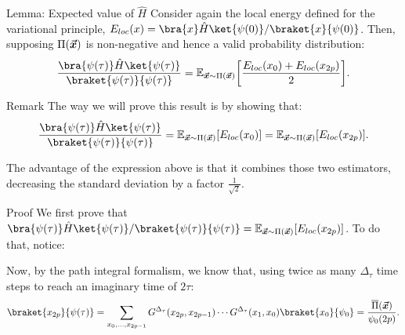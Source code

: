 \documentclass[a4paper]{article}
\begin{document}
\begin{parag}{Lemma: Expected value of $\hat{H}$}
    Consider again the local energy defined for the variational principle, $E_{loc}\left(x\right) = \bra{x} \hat{H} \ket{\psi\left(0\right)} / \braket{x}{\psi\left(0\right)}$. Then, supposing $\Pi\left(\bvec{x}\right)$ is non-negative and hence a valid probability distribution: 
    \[\frac{\bra{\psi\left(\tau\right)} \hat{H} \ket{\psi\left(\tau\right)}}{\braket{\psi\left(\tau\right)}{\psi\left(\tau\right)}} = \exval_{\bvec{x} \followsdistr \Pi\left(\bvec{x}\right)}\left[\frac{E_{loc}\left(x_0\right) + E_{loc}\left(x_{2p}\right)}{2}\right].\]
    
    \begin{subparag}{Remark}
        The way we will prove this result is by showing that:
        \[\frac{\bra{\psi\left(\tau\right)} \hat{H} \ket{\psi\left(\tau\right)}}{\braket{\psi\left(\tau\right)}{\psi\left(\tau\right)}} = \exval_{\bvec{x} \followsdistr \Pi\left(\bvec{x}\right)}\left[E_{loc}\left(x_0\right)\right] = \exval_{\bvec{x} \followsdistr \Pi\left(\bvec{x}\right)}\left[E_{loc}\left(x_{2p}\right)\right].\]

        The advantage of the expression above is that it combines those two estimators, decreasing the standard deviation by a factor $\frac{1}{\sqrt{2}}$.
    \end{subparag}
    
    \begin{subparag}{Proof}
        We first prove that $\bra{\psi\left(\tau\right)} \hat{H} \ket{\psi\left(\tau\right)}/\braket{\psi\left(\tau\right)}{\psi\left(\tau\right)} = \exval_{\bvec{x} \followsdistr \Pi\left(\bvec{x}\right)}\left[E_{loc}\left(x_{2p}\right)\right]$. To do that, notice:

        Now, by the path integral formalism, we know that, using twice as many $\Delta_{\tau}$ time steps to reach an imaginary time of $2\tau$:
        \[\braket{x_{2p}}{\psi\left(\tau\right)} = \sum_{x_0, \ldots, x_{2p-1}} G^{\Delta_{\tau}}\left(x_{2p}, x_{2p - 1}\right) \cdots G^{\Delta_{\tau}}\left(x_1, x_0\right) \braket{x_0}{\psi_0} = \frac{\bar{\Pi}\left(\bvec{x}\right)}{\psi_0\left(2p\right)}.\]


\end{subparag}
\end{parag}
\end{document}
